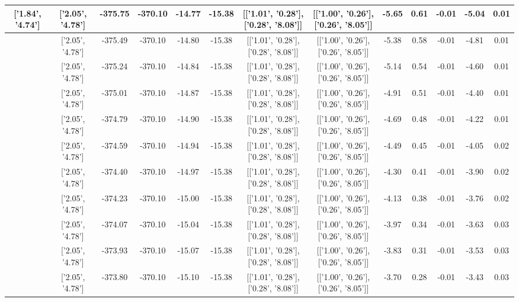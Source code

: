\begin{table}[htbp]
\begin{adjustbox}{angle=90}
\begin{tabular}{|c|c|c|c|c|c|c|c|c|c|c|c|c|}
 ['1.84', '4.74'] & ['2.05', '4.78'] & -375.75 & -370.10 & -14.77 & -15.38 & [['1.01', '0.28'], ['0.28', '8.08']] & [['1.00', '0.26'], ['0.26', '8.05']] & -5.65 & 0.61 & -0.01 & -5.04 & 0.01\\ \hline
 ['1.86', '4.74'] & ['2.05', '4.78'] & -375.49 & -370.10 & -14.80 & -15.38 & [['1.01', '0.28'], ['0.28', '8.08']] & [['1.00', '0.26'], ['0.26', '8.05']] & -5.38 & 0.58 & -0.01 & -4.81 & 0.01\\ \hline
 ['1.87', '4.74'] & ['2.05', '4.78'] & -375.24 & -370.10 & -14.84 & -15.38 & [['1.01', '0.28'], ['0.28', '8.08']] & [['1.00', '0.26'], ['0.26', '8.05']] & -5.14 & 0.54 & -0.01 & -4.60 & 0.01\\ \hline
 ['1.88', '4.75'] & ['2.05', '4.78'] & -375.01 & -370.10 & -14.87 & -15.38 & [['1.01', '0.28'], ['0.28', '8.08']] & [['1.00', '0.26'], ['0.26', '8.05']] & -4.91 & 0.51 & -0.01 & -4.40 & 0.01\\ \hline
 ['1.89', '4.75'] & ['2.05', '4.78'] & -374.79 & -370.10 & -14.90 & -15.38 & [['1.01', '0.28'], ['0.28', '8.08']] & [['1.00', '0.26'], ['0.26', '8.05']] & -4.69 & 0.48 & -0.01 & -4.22 & 0.01\\ \hline
 ['1.90', '4.75'] & ['2.05', '4.78'] & -374.59 & -370.10 & -14.94 & -15.38 & [['1.01', '0.28'], ['0.28', '8.08']] & [['1.00', '0.26'], ['0.26', '8.05']] & -4.49 & 0.45 & -0.01 & -4.05 & 0.02\\ \hline
 ['1.91', '4.75'] & ['2.05', '4.78'] & -374.40 & -370.10 & -14.97 & -15.38 & [['1.01', '0.28'], ['0.28', '8.08']] & [['1.00', '0.26'], ['0.26', '8.05']] & -4.30 & 0.41 & -0.01 & -3.90 & 0.02\\ \hline
 ['1.92', '4.76'] & ['2.05', '4.78'] & -374.23 & -370.10 & -15.00 & -15.38 & [['1.01', '0.28'], ['0.28', '8.08']] & [['1.00', '0.26'], ['0.26', '8.05']] & -4.13 & 0.38 & -0.01 & -3.76 & 0.02\\ \hline
 ['1.94', '4.76'] & ['2.05', '4.78'] & -374.07 & -370.10 & -15.04 & -15.38 & [['1.01', '0.28'], ['0.28', '8.08']] & [['1.00', '0.26'], ['0.26', '8.05']] & -3.97 & 0.34 & -0.01 & -3.63 & 0.03\\ \hline
 ['1.95', '4.76'] & ['2.05', '4.78'] & -373.93 & -370.10 & -15.07 & -15.38 & [['1.01', '0.28'], ['0.28', '8.08']] & [['1.00', '0.26'], ['0.26', '8.05']] & -3.83 & 0.31 & -0.01 & -3.53 & 0.03\\ \hline
 ['1.96', '4.76'] & ['2.05', '4.78'] & -373.80 & -370.10 & -15.10 & -15.38 & [['1.01', '0.28'], ['0.28', '8.08']] & [['1.00', '0.26'], ['0.26', '8.05']] & -3.70 & 0.28 & -0.01 & -3.43 & 0.03\\ \hline

\end{tabular}
\end{adjustbox}
\end{table}
